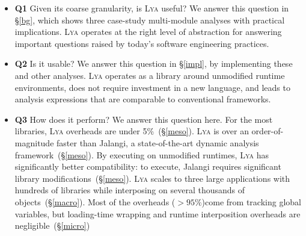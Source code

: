 \documentclass[letterpaper,twocolumn,10pt]{article}
\newcommand{\ttt}[1]{\texttt{#1}}
\newcommand{\sx}[1]{(\S\ref{#1})}
\newcommand{\sys}{{\scshape Lya}\xspace}
\begin{document}
\begin{itemize}
  \item \textbf{Q1} Given its coarse granularity, is \sys useful?
    We answer this question in \S\ref{bg}, which shows three case-study multi-module analyses with practical implications.
    \sys operates at the right level of abstraction for answering important questions raised by today's software engineering practices.

  \item \textbf{Q2} Is it usable?
     We answer this question in \S\ref{impl}, by implementing these and other analyses.
    \sys operates as a library around unmodified runtime environments, does not require investment in a new language, and leads to analysis expressions that are comparable to conventional frameworks.

  \item \textbf{Q3} How does it perform? We answer this question here.
  For the most libraries, \sys overheads are under 5\%~\sx{meso}.
  \sys is over an order-of-magnitude faster than Jalangi, a state-of-the-art dynamic analysis framework~\sx{meso}.
  By executing on unmodified runtimes, \sys has significantly better compatibility:
    to execute, Jalangi requires significant library modifications~\sx{meso}.
  \sys scales to three large applications with hundreds of libraries while interposing on several thousands of objects~\sx{macro}.
    Most of the overheads ($>95\%$)come from tracking global variables, but loading-time wrapping and runtime interposition overheads are negligible~\sx{micro}

\end{itemize}

\end{document}
